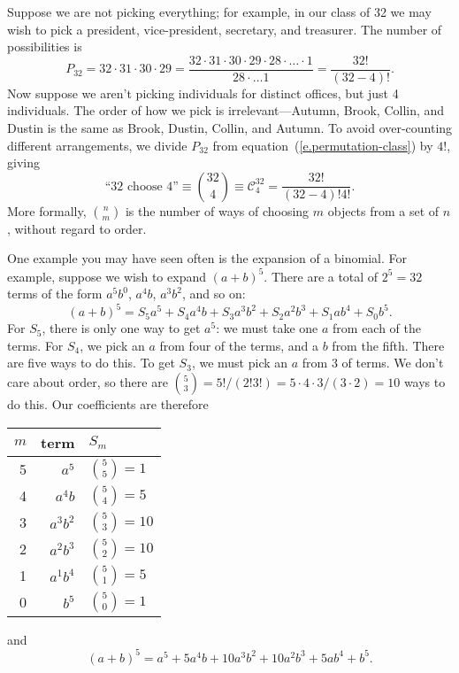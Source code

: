 Suppose we are not picking everything; for example, in our class of 32 we may wish to pick a president, vice-president, secretary, and treasurer. The number of possibilities is
\begin{equation}\label{e.permutation-class}
 P_{32} = 32\cdot31\cdot30\cdot29 = \frac{32\cdot31\cdot30\cdot29\cdot28\cdot\ldots\cdot 1}{28\cdot\ldots 1} = \frac{32!}{(32-4)!}.
\end{equation}
Now suppose we aren't picking individuals for distinct offices, but just 4 individuals.  The order of how we pick is irrelevant---Autumn, Brook, Collin, and Dustin is the same as Brook, Dustin, Collin, and Autumn.  To avoid over-counting different arrangements, we divide $P_{32}$ from equation~(\ref{e.permutation-class}) by $4!$, giving
\begin{equation}\label{e.combination-class}
\textrm{``32 choose 4''} \equiv {32\choose4} \equiv \mathcal{C}^{32}_{4} = \frac{32!}{(32-4)!4!}.
\end{equation}
More formally, ${n\choose m}$ is the number of ways of choosing $m$ objects from a set of $n$, without regard to order.

One example you may have seen often is the expansion of a binomial.  For example, suppose we wish to expand $(a+b)^{5}$.  There are a total of $2^{5}=32$ terms of the form $a^{5}b^{0}$, $a^{4}b$, $a^{3}b^{2}$, and so on:
\[
	(a+b)^{5} = S_{5}a^{5}+S_{4}a^{4}b+S_{3}a^{3}b^{2}+S_{2}a^{2}b^{3}+S_{1}ab^{4}+S_{0}b^{5}.
\]
For $S_{5}$, there is only one way to get $a^{5}$: we must take one $a$ from each of the terms.  For $S_{4}$, we pick an $a$ from four of the terms, and a $b$ from the fifth. There are five ways to do this.  To get $S_{3}$, we must pick an $a$ from 3 of terms.  We don't care about order, so there are ${5\choose3} = 5!/(2!3!) = 5\cdot4\cdot3/(3\cdot2)=10$ ways to do this.  Our coefficients are therefore
\begin{center}
\begin{tabular}{rrl}
$m$ & term 			& $S_{m}$\\
\hline
5	& $a^{5}$		& ${5\choose5}=1$\\
4	& $a^{4}b$		& ${5\choose4}=5$\\
3	& $a^{3}b^{2}$	& ${5\choose3}=10$\\
2	& $a^{2}b^{3}$	& ${5\choose2}=10$\\
1	& $a^{1}b^{4}$	& ${5\choose1}=5$\\
0	& $b^{5}$		& ${5\choose0}=1$\\
\end{tabular}
\end{center}
and
\[ (a+b)^{5} = a^{5}+5a^{4}b+10a^{3}b^{2}+10a^{2}b^{3}+5ab^{4}+b^{5}. \]

